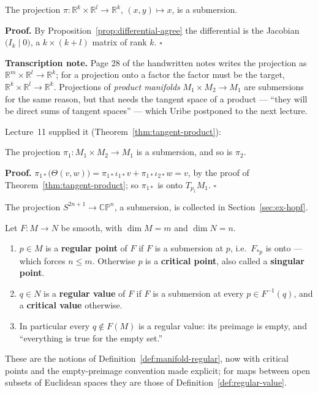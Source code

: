 \documentclass[11pt]{report}
\makeatletter
\newcounter{defcounter}[section]
\newcounter{excounter}[section]
\renewenvironment{proof}[1][Proof]{\noindent\textbf{#1.} }{\hfill$\square$\par\vspace{5pt}}
\newcommand{\deflabel}[1]{\edef\@currentlabel{\arabic{section}.\arabic{defcounter}}\label{#1}}
\newcommand{\exlabel}[1]{\edef\@currentlabel{\arabic{section}.\arabic{excounter}}\label{#1}}
\newcommand{\leeref}[1]{\par\smallskip{\raggedleft\footnotesize\textsc{Lee}:\ #1\par}}
\makeatother
\begin{document}
\begin{exbox}\exlabel{ex:projection-submersion}
The projection $\pi : \mathbb{R}^k \times \mathbb{R}^l \to \mathbb{R}^k$, $(x, y) \mapsto x$, is a submersion.
\end{exbox}

\begin{proof}
By Proposition~\ref{prop:differential-agree} the differential is the Jacobian $\big(I_k \mid 0\big)$, a $k \times (k+l)$ matrix of rank $k$.
\end{proof}

\textbf{Transcription note.} Page 28 of the handwritten notes writes the projection as $\mathbb{R}^m \times \mathbb{R}^l \to \mathbb{R}^k$; for a projection onto a factor the factor must be the target, $\mathbb{R}^k \times \mathbb{R}^l \to \mathbb{R}^k$. Projections of \emph{product manifolds} $M_1 \times M_2 \to M_1$ are submersions for the same reason, but that needs the tangent space of a product --- ``they will be direct sums of tangent spaces'' --- which Uribe postponed to the next lecture.

Lecture~11 supplied it (Theorem~\ref{thm:tangent-product}):

\begin{exbox}\exlabel{ex:product-projection-submersion}
The projection $\pi_1 : M_1 \times M_2 \to M_1$ is a submersion, and so is $\pi_2$.
\leeref{Proposition 3.14}
\end{exbox}

\begin{proof}
$\pi_{1*}\big(\Theta(v, w)\big) = \pi_{1*}\iota_{1*}v + \pi_{1*}\iota_{2*}w = v$, by the proof of Theorem~\ref{thm:tangent-product}; so $\pi_{1*}$ is onto $T_{p_1}M_1$.
\end{proof}

The projection $S^{2n+1} \to \mathbb{CP}^n$, a submersion, is collected in Section~\ref{sec:ex-hopf}.

\begin{defbox}\deflabel{def:regular-critical}
Let $F : M \to N$ be smooth, with $\dim M = m$ and $\dim N = n$.
\begin{enumerate}
    \item $p \in M$ is a \textbf{regular point} of $F$ if $F$ is a submersion at $p$, i.e.\ $F_{*p}$ is onto --- which forces $n \le m$. Otherwise $p$ is a \textbf{critical point}, also called a \textbf{singular point}.
    \item $q \in N$ is a \textbf{regular value} of $F$ if $F$ is a submersion at every $p \in F^{-1}(q)$, and a \textbf{critical value} otherwise.
    \item In particular every $q \notin F(M)$ is a regular value: its preimage is empty, and ``everything is true for the empty set.''
\end{enumerate}
These are the notions of Definition~\ref{def:manifold-regular}, now with critical points and the empty-preimage convention made explicit; for maps between open subsets of Euclidean spaces they are those of Definition~\ref{def:regular-value}.
\end{defbox}
\end{document}
